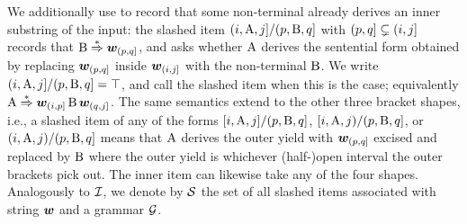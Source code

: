 \documentclass{article}
\begin{document}
We additionally use  to record that some non-terminal already derives an inner substring of the input:
the slashed item $({{ i}}, {{ \mathrm{A}}}, {{ j}}] / (p, {{ \mathrm{B}}}, q]$ with $(p,q] \subsetneq ({{ i}},{{ j}}]$ records that ${{ \mathrm{B}}} \mathrel{{\overset{*}{\Rightarrow}}} {{\boldsymbol{w}}}_{(p, q]}$, and asks whether ${{ \mathrm{A}}}$ derives the sentential form obtained by replacing ${{\boldsymbol{w}}}_{(p, q]}$ inside ${{\boldsymbol{w}}}_{({{ i}}, {{ j}}]}$ with the non-terminal ${{ \mathrm{B}}}$. We write $({{ i}}, {{ \mathrm{A}}}, {{ j}}] / (p, {{ \mathrm{B}}}, q] = \top$, and call the slashed item  when this is the case; equivalently ${{ \mathrm{A}}} \mathrel{{\overset{*}{\Rightarrow}}} {{\boldsymbol{w}}}_{({{ i}}, p]} \, {{ \mathrm{B}}} \, {{\boldsymbol{w}}}_{(q, {{ j}}]}$.
The same semantics extend to the other three bracket shapes, i.e., a slashed item of any of the forms $[{{ i}}, {{ \mathrm{A}}}, {{ j}}] / (p, {{ \mathrm{B}}}, q]$, $[{{ i}}, {{ \mathrm{A}}}, {{ j}}) / (p, {{ \mathrm{B}}}, q]$, or $({{ i}}, {{ \mathrm{A}}}, {{ j}}) / (p, {{ \mathrm{B}}}, q]$ means that ${{ \mathrm{A}}}$ derives the outer yield with ${{\boldsymbol{w}}}_{(p, q]}$ excised and replaced by ${{ \mathrm{B}}}$ where the outer yield is whichever (half-)open interval the outer brackets pick out. The inner item can likewise take any of the four shapes.
Analogously to ${{\mathcal{I}}}$, we denote by ${{\mathcal{S}}}$ the set of all slashed items associated with string ${{\boldsymbol{w}}}$ and a grammar ${{ \mathcal{G}}}$.
\end{document}
